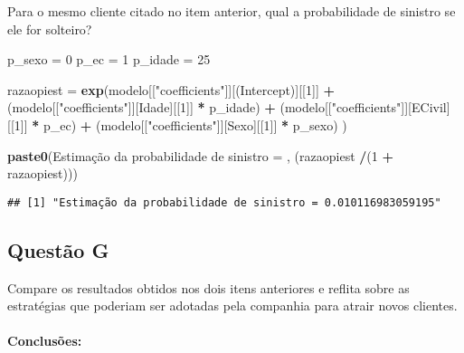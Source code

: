 \documentclass[
]{article}
\newenvironment{Shaded}{\begin{snugshade}}{\end{snugshade}}
\newcommand{\DecValTok}[1]{\textcolor[rgb]{0.00,0.00,0.81}{#1}}
\newcommand{\FunctionTok}[1]{\textcolor[rgb]{0.13,0.29,0.53}{\textbf{#1}}}
\newcommand{\NormalTok}[1]{#1}
\newcommand{\OtherTok}[1]{\textcolor[rgb]{0.56,0.35,0.01}{#1}}
\newcommand{\SpecialCharTok}[1]{\textcolor[rgb]{0.81,0.36,0.00}{\textbf{#1}}}
\newcommand{\StringTok}[1]{\textcolor[rgb]{0.31,0.60,0.02}{#1}}
\begin{document}
Para o mesmo cliente citado no item anterior, qual a probabilidade de
sinistro se ele for solteiro?

\begin{Shaded}
\begin{Highlighting}[]
\NormalTok{p\_sexo }\OtherTok{=} \DecValTok{0}
\NormalTok{p\_ec }\OtherTok{=} \DecValTok{1}
\NormalTok{p\_idade }\OtherTok{=} \DecValTok{25}

\NormalTok{razaopiest }\OtherTok{=} \FunctionTok{exp}\NormalTok{(modelo[[}\StringTok{"coefficients"}\NormalTok{]][}\StringTok{\textquotesingle{}(Intercept)\textquotesingle{}}\NormalTok{][[}\DecValTok{1}\NormalTok{]] }\SpecialCharTok{+} 
\NormalTok{                 (modelo[[}\StringTok{"coefficients"}\NormalTok{]][}\StringTok{\textquotesingle{}Idade\textquotesingle{}}\NormalTok{][[}\DecValTok{1}\NormalTok{]] }\SpecialCharTok{*}\NormalTok{ p\_idade) }\SpecialCharTok{+}
\NormalTok{                 (modelo[[}\StringTok{"coefficients"}\NormalTok{]][}\StringTok{\textquotesingle{}ECivil\textquotesingle{}}\NormalTok{][[}\DecValTok{1}\NormalTok{]] }\SpecialCharTok{*}\NormalTok{ p\_ec) }\SpecialCharTok{+}
\NormalTok{                 (modelo[[}\StringTok{"coefficients"}\NormalTok{]][}\StringTok{\textquotesingle{}Sexo\textquotesingle{}}\NormalTok{][[}\DecValTok{1}\NormalTok{]] }\SpecialCharTok{*}\NormalTok{ p\_sexo)}
\NormalTok{                 )}

\FunctionTok{paste0}\NormalTok{(}\StringTok{\textquotesingle{}Estimação da probabilidade de sinistro = \textquotesingle{}}\NormalTok{,}
\NormalTok{       (razaopiest }\SpecialCharTok{/}\NormalTok{(}\DecValTok{1} \SpecialCharTok{+}\NormalTok{ razaopiest)))}
\end{Highlighting}
\end{Shaded}

\begin{verbatim}
## [1] "Estimação da probabilidade de sinistro = 0.010116983059195"
\end{verbatim}

\hypertarget{questuxe3o-g-1}{%
\subsection{Questão G}\label{questuxe3o-g-1}}

Compare os resultados obtidos nos dois itens anteriores e reflita sobre
as estratégias que poderiam ser adotadas pela companhia para atrair
novos clientes.

\hypertarget{conclusuxf5es-17}{%
\paragraph{Conclusões:}\label{conclusuxf5es-17}}
\end{document}
